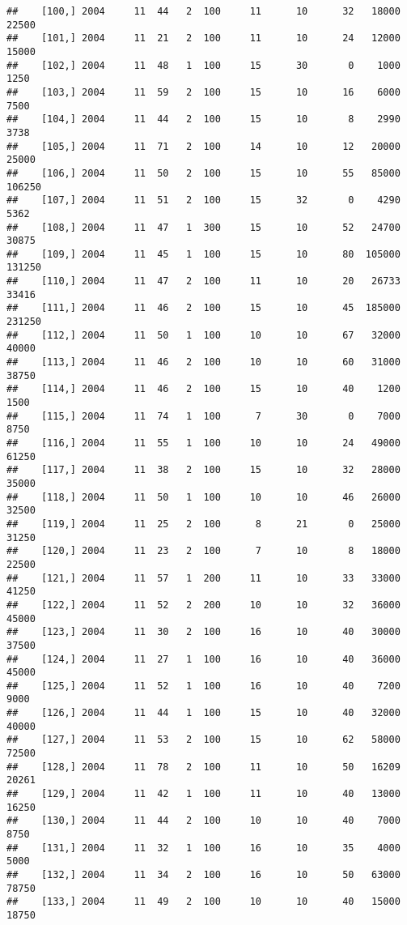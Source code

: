 \documentclass{article}\usepackage[]{graphicx}\usepackage[]{color}
\makeatletter
\newenvironment{kframe}{%
 \def\at@end@of@kframe{}%
 \ifinner\ifhmode%
  \def\at@end@of@kframe{\end{minipage}}%
  \begin{minipage}{\columnwidth}%
 \fi\fi%
 \def\FrameCommand##1{\hskip\@totalleftmargin \hskip-\fboxsep
 \colorbox{shadecolor}{##1}\hskip-\fboxsep
     \hskip-\linewidth \hskip-\@totalleftmargin \hskip\columnwidth}%
 \MakeFramed {\advance\hsize-\width
   \@totalleftmargin\z@ \linewidth\hsize
   \@setminipage}}%
 {\par\unskip\endMakeFramed%
 \at@end@of@kframe}
\newenvironment{knitrout}{}{} %
\makeatother
\begin{document}
\begin{knitrout}
\begin{kframe}
\begin{verbatim}
##    [100,] 2004     11  44   2  100     11      10      32   18000   22500
##    [101,] 2004     11  21   2  100     11      10      24   12000   15000
##    [102,] 2004     11  48   1  100     15      30       0    1000    1250
##    [103,] 2004     11  59   2  100     15      10      16    6000    7500
##    [104,] 2004     11  44   2  100     15      10       8    2990    3738
##    [105,] 2004     11  71   2  100     14      10      12   20000   25000
##    [106,] 2004     11  50   2  100     15      10      55   85000  106250
##    [107,] 2004     11  51   2  100     15      32       0    4290    5362
##    [108,] 2004     11  47   1  300     15      10      52   24700   30875
##    [109,] 2004     11  45   1  100     15      10      80  105000  131250
##    [110,] 2004     11  47   2  100     11      10      20   26733   33416
##    [111,] 2004     11  46   2  100     15      10      45  185000  231250
##    [112,] 2004     11  50   1  100     10      10      67   32000   40000
##    [113,] 2004     11  46   2  100     10      10      60   31000   38750
##    [114,] 2004     11  46   2  100     15      10      40    1200    1500
##    [115,] 2004     11  74   1  100      7      30       0    7000    8750
##    [116,] 2004     11  55   1  100     10      10      24   49000   61250
##    [117,] 2004     11  38   2  100     15      10      32   28000   35000
##    [118,] 2004     11  50   1  100     10      10      46   26000   32500
##    [119,] 2004     11  25   2  100      8      21       0   25000   31250
##    [120,] 2004     11  23   2  100      7      10       8   18000   22500
##    [121,] 2004     11  57   1  200     11      10      33   33000   41250
##    [122,] 2004     11  52   2  200     10      10      32   36000   45000
##    [123,] 2004     11  30   2  100     16      10      40   30000   37500
##    [124,] 2004     11  27   1  100     16      10      40   36000   45000
##    [125,] 2004     11  52   1  100     16      10      40    7200    9000
##    [126,] 2004     11  44   1  100     15      10      40   32000   40000
##    [127,] 2004     11  53   2  100     15      10      62   58000   72500
##    [128,] 2004     11  78   2  100     11      10      50   16209   20261
##    [129,] 2004     11  42   1  100     11      10      40   13000   16250
##    [130,] 2004     11  44   2  100     10      10      40    7000    8750
##    [131,] 2004     11  32   1  100     16      10      35    4000    5000
##    [132,] 2004     11  34   2  100     16      10      50   63000   78750
##    [133,] 2004     11  49   2  100     10      10      40   15000   18750

\end{verbatim}
\end{kframe}
\end{knitrout}
\end{document}
